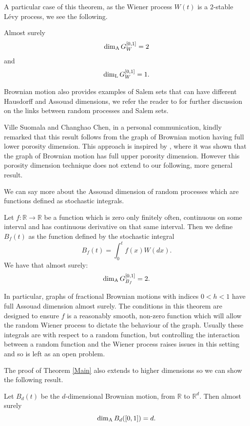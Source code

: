 A particular case of this theorem, as the Wiener process $W(t)$ is a $2$-stable L\'evy process, we see the following.
\begin{corollary}
Almost surely
	\[
	\dim_{\textup{A}} G_{W}^{[0,1]}=2
	\]
	and 
	\[
	\dim_{\textup{L}} G_{W}^{[0,1]}=1.
	\]
\end{corollary}

Brownian motion also provides examples of Salem sets that can have different Hausdorff and Assouad dimensions, we refer the reader to \cite{Ka}  for further discussion on the links between random processes and Salem sets.

Ville Suomala and Changhao Chen, in a personal communication, kindly remarked that this result follows from the graph of Brownian motion having full lower porosity dimension. This approach is inspired by \cite{coxgriffin}, where it was shown that the graph of Brownian motion has full upper porosity dimension. However this porosity dimension technique does not extend to our following, more general result.

We can say more about the Assouad dimension of random processes which are functions defined as stochastic integrals. 

\begin{theorem}\label{ch-brownian:stochastic}
	Let $f:\mathbb{R}\to\mathbb{R}$ be a function which is zero only finitely often, continuous on some interval and has continuous derivative on that same interval. Then we define $B_f(t)$ as the function defined by the stochastic integral
	\[	
	B_f(t)=\int_0^t f(x) W(dx).
	\]
	We have that almost surely:
	\[
	\dim_{\textup{A}} G_{B_f}^{[0,1]}=2.
	\]
\end{theorem}

In particular, graphs of fractional Brownian motions with indices $0<h<1$ have full Assouad dimension almost surely. The conditions in this theorem are designed to ensure $f$ is a reasonably smooth, non-zero function which will allow the random Wiener process to dictate the behaviour of the graph. Usually these integrals are with respect to a random function, but controlling the interaction between a random function and the Wiener process raises issues in this setting and so is left as an open problem. 


The proof of Theorem \ref{Main} also extends to higher dimensions so we can show the following result.

\begin{theorem}\label{ch-brownian:brownian-d-dim}
	Let $B_d(t)$ be the $d$-dimensional Brownian motion, from $\mathbb{R}$ to $\mathbb{R}^d$. Then almost surely
	\[
	\dim_{\textup{A}} B_d([0,1])=d.
	\]
\end{theorem}

